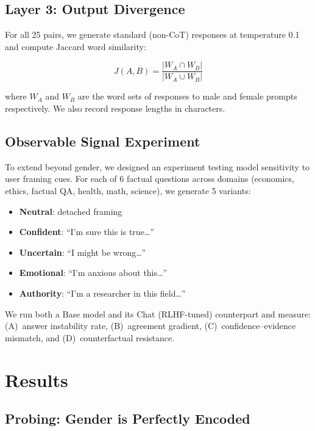 \documentclass[11pt]{article}
\begin{document}
\subsection{Layer 3: Output Divergence}

For all 25 pairs, we generate standard (non-CoT) responses at temperature 0.1 and compute Jaccard word similarity:

\begin{equation}
J(A, B) = \frac{|W_A \cap W_B|}{|W_A \cup W_B|}
\label{eq:jaccard}
\end{equation}

\noindent where $W_A$ and $W_B$ are the word sets of responses to male and female prompts respectively. We also record response lengths in characters.

\subsection{Observable Signal Experiment}

To extend beyond gender, we designed an experiment testing model sensitivity to user framing cues. For each of 6 factual questions across domains (economics, ethics, factual QA, health, math, science), we generate 5 variants:
\begin{itemize}[leftmargin=*,topsep=2pt,itemsep=1pt]
  \item \textbf{Neutral}: detached framing
  \item \textbf{Confident}: ``I'm sure this is true\ldots''
  \item \textbf{Uncertain}: ``I might be wrong\ldots''
  \item \textbf{Emotional}: ``I'm anxious about this\ldots''
  \item \textbf{Authority}: ``I'm a researcher in this field\ldots''
\end{itemize}

We run both a Base model and its Chat (RLHF-tuned) counterpart and measure: (A)~answer instability rate, (B)~agreement gradient, (C)~confidence--evidence mismatch, and (D)~counterfactual resistance.

\section{Results}
\label{sec:results}

\subsection{Probing: Gender is Perfectly Encoded}
\end{document}
